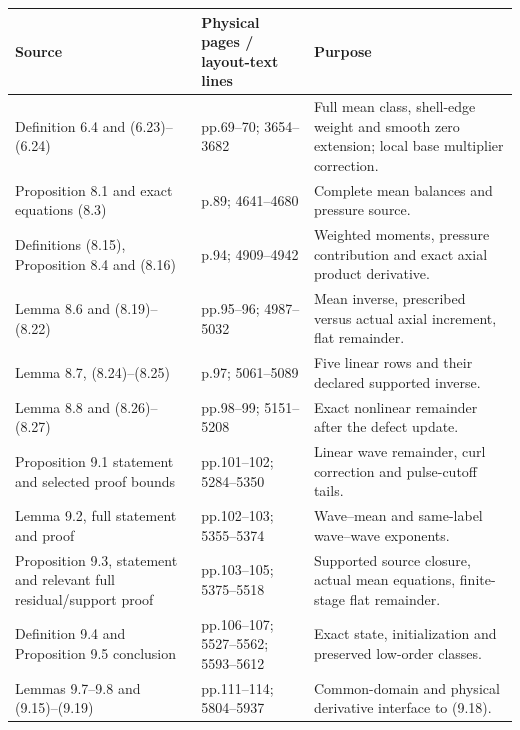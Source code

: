 \documentclass[10pt,a4paper]{article}
\newcounter{none}
\begin{document}
{\def\LTcaptype{none} %
\begin{longtable}[]{@{}
  >{\raggedright\arraybackslash}p{}
  >{\raggedright\arraybackslash}p{}
  >{\raggedright\arraybackslash}p{}@{}}
\toprule\noalign{}
\begin{minipage}[b]{\linewidth}\raggedright
Source
\end{minipage} & \begin{minipage}[b]{\linewidth}\raggedright
Physical pages / layout-text lines
\end{minipage} & \begin{minipage}[b]{\linewidth}\raggedright
Purpose
\end{minipage} \\
\midrule\noalign{}
\endhead
\bottomrule\noalign{}
\endlastfoot
Definition 6.4 and (6.23)--(6.24) & pp.69--70; 3654--3682 & Full mean class, shell-edge weight and smooth zero extension; local base multiplier correction. \\
Proposition 8.1 and exact equations (8.3) & p.89; 4641--4680 & Complete mean balances and pressure source. \\
Definitions (8.15), Proposition 8.4 and (8.16) & p.94; 4909--4942 & Weighted moments, pressure contribution and exact axial product derivative. \\
Lemma 8.6 and (8.19)--(8.22) & pp.95--96; 4987--5032 & Mean inverse, prescribed versus actual axial increment, flat remainder. \\
Lemma 8.7, (8.24)--(8.25) & p.97; 5061--5089 & Five linear rows and their declared supported inverse. \\
Lemma 8.8 and (8.26)--(8.27) & pp.98--99; 5151--5208 & Exact nonlinear remainder after the defect update. \\
Proposition 9.1 statement and selected proof bounds & pp.101--102; 5284--5350 & Linear wave remainder, curl correction and pulse-cutoff tails. \\
Lemma 9.2, full statement and proof & pp.102--103; 5355--5374 & Wave--mean and same-label wave--wave exponents. \\
Proposition 9.3, statement and relevant full residual/support proof & pp.103--105; 5375--5518 & Supported source closure, actual mean equations, finite-stage flat remainder. \\
Definition 9.4 and Proposition 9.5 conclusion & pp.106--107; 5527--5562; 5593--5612 & Exact state, initialization and preserved low-order classes. \\
Lemmas 9.7--9.8 and (9.15)--(9.19) & pp.111--114; 5804--5937 & Common-domain and physical derivative interface to (9.18). \\
\end{longtable}
}
\end{document}
